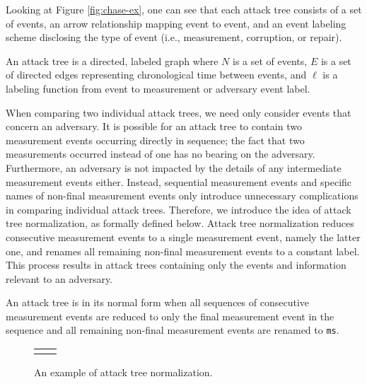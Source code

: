 \documentclass[runningheads]{llncs}
\theoremstyle{definition}
\begin{document}
\noindent Looking at Figure \ref{fig:chase-ex}, one can see that each attack tree consists of a set of events, an arrow relationship mapping event to event, and an event labeling scheme disclosing the type of event (i.e., measurement, corruption, or repair).

\begin{definition}
    An attack tree is a directed, labeled graph where $N$ is a set of events, $E$ is a set of directed edges representing chronological time between events, and $\ell$ is a labeling function from event to measurement or adversary event label.
\end{definition}

When comparing two individual attack trees, we need only consider
events that concern an adversary. It is possible for an attack tree to
contain two measurement events occurring directly in sequence; the
fact that two measurements occurred instead of one has no bearing on
the adversary. Furthermore, an adversary is not impacted by the
details of any intermediate measurement events either. Instead,
sequential measurement events and specific names of non-final
measurement events only introduce unnecessary complications in
comparing individual attack trees. Therefore, we introduce the idea of
attack tree normalization, as formally defined below. Attack tree
normalization reduces consecutive measurement events to a single
measurement event, namely the latter one, and renames all remaining
non-final measurement events to a constant label. This process results
in attack trees containing only the events and information relevant to
an adversary.  


\begin{definition}
    An attack tree is in its normal form when all sequences of consecutive measurement events are reduced to only the final measurement event in the sequence and all remaining non-final measurement events are renamed to \texttt{ms}. 
\end{definition}

\begin{figure}[htbp]
  \centering 
  \begin{tabular}{c c}
       &  
  \end{tabular}
  \captionsetup{justification=centering,margin=1cm}
  \caption[Example of attack tree normalization]{An example of attack tree normalization.}
  \label{fig:reduce-ex}
\end{figure}
\end{document}
